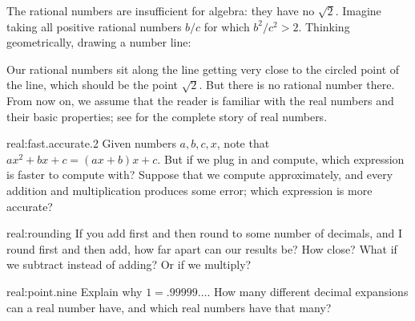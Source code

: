 The rational numbers are insufficient for algebra: they have no \(\sqrt{2}\).
Imagine taking all positive rational numbers \(b/c\) for which \(b^2/c^2 > 2\).
Thinking geometrically, drawing a number line:
\begin{center}

\end{center}
Our rational numbers sit along the line getting very close to the circled point of the line, which should be the point \(\sqrt{2}\).
But there is no rational number there.
From now on, we assume that the reader is familiar with the real numbers and their basic properties; see \cite{Spivak:2006} for the complete story of real numbers.
\begin{problem}{real:fast.accurate.2}
Given numbers \(a,b,c,x\), note that \(ax^2+bx+c=(ax+b)x+c\).
But if we plug in and compute, which expression is faster to compute with?
Suppose that we compute approximately, and every addition and multiplication produces some error; which expression is more accurate?
\end{problem}
\begin{problem}{real:rounding}
If you add first and then round to some number of decimals, and I round first and then add, how far apart can our results be? How close? What if we subtract instead of adding?
Or if we multiply?
\end{problem}
\begin{problem}{real:point.nine}
Explain why \(1=.99999\dots\).
How many different decimal expansions can a real number have, and which real numbers have that many?
\end{problem}

